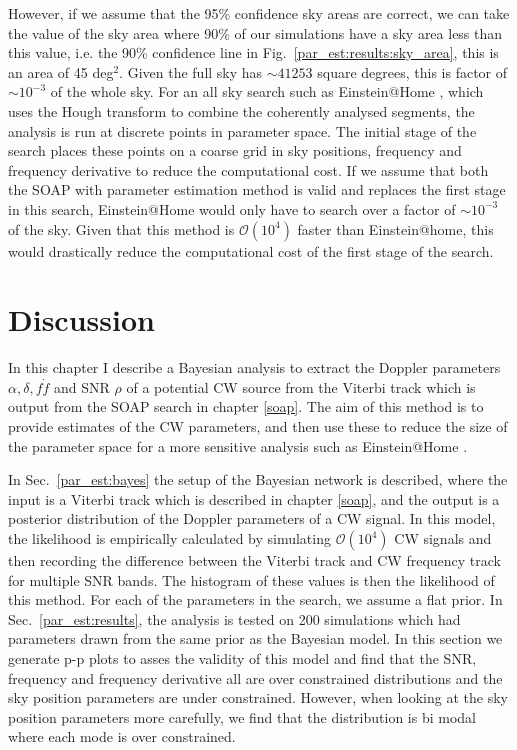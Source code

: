 However, if we assume that the 95\% confidence sky areas are correct, we can take the value of the sky area where 90\% of our simulations have a sky area less than this value, i.e. the 90\% confidence line in Fig.~\ref{par_est:results:sky_area}, this is an area of 45 deg$^2$.
Given the full sky has $\sim 41253$ square degrees, this is factor of $\sim 10^{-3}$ of the whole sky.
For an all sky search such as Einstein@Home \citep{theligoscientificcollaborationandthevirgocollaboration2013EinsteinHome,singh2016ResultsAllsky}, which uses the Hough transform \citep{krishnan2004HoughTransform} to combine the coherently analysed segments, the analysis is run at discrete points in parameter space. The initial stage of the search places these points on a coarse grid in sky positions, frequency and frequency derivative to reduce the computational cost.
 If we assume that both the SOAP with parameter estimation method is valid and replaces the first stage in this search, Einstein@Home would only have to search over a factor of $\sim 10^{-3}$ of the sky. 
 Given that this method is $\mathcal{O}(10^4)$ faster than Einstein@home, this would drastically reduce the computational cost of the first stage of the search. 



%
%
\section{Discussion}
%
%

In this chapter I describe a Bayesian analysis to extract the Doppler parameters $\alpha, \delta, f \dot{f}$ and \gls{SNR} $\rho$ of a potential \gls{CW} source from the Viterbi track which is output from the SOAP search in chapter \ref{soap}.
The aim of this method is to provide estimates of the \gls{CW} parameters, and then use these to reduce the size of the parameter space for a more sensitive analysis such as Einstein@Home \citep{singh2016ResultsAllsky}. 

In Sec.~\ref{par_est:bayes} the setup of the Bayesian network is described, where the input is a Viterbi track which is described in chapter \ref{soap}, and the output is a posterior distribution of the Doppler parameters of a \gls{CW} signal.
In this model, the likelihood is empirically calculated by simulating $\mathcal{O}(10^4)$ \gls{CW} signals and then recording the difference between the Viterbi track and \gls{CW} frequency track for multiple \gls{SNR} bands. 
The histogram of these values is then the likelihood of this method.
For each of the parameters in the search, we assume a flat prior.
In Sec.~\ref{par_est:results}, the analysis is tested on 200 simulations which had parameters drawn from the same prior as the Bayesian model.
In this section we generate p-p plots to asses the validity of this model and find that the \gls{SNR}, frequency and frequency derivative all are over constrained distributions and the sky position parameters are under constrained.
However, when looking at the sky position parameters more carefully, we find that the distribution is bi modal where each mode is over constrained.

